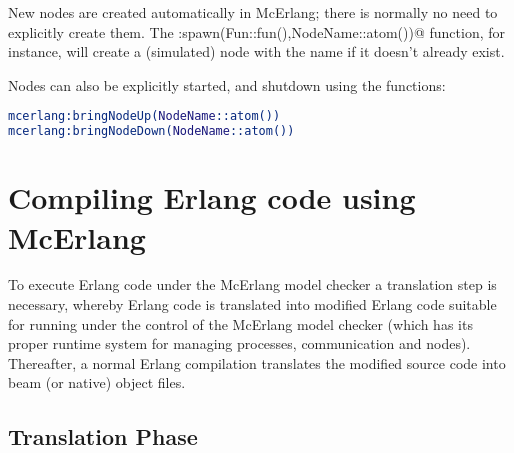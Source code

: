 \documentclass[a4paper]{article}
\begin{document}
New nodes are created automatically in McErlang; there is normally
no need to explicitly create them. 
The \lstinline@mcerlang:spawn(Fun::fun(),NodeName::atom())@
function, for instance, will create a (simulated) node
with the name \lstinline@NodeName@ if it doesn't already exist.

Nodes can also be explicitly started, and shutdown using
the functions:
\begin{lstlisting}[language=Erlang]
mcerlang:bringNodeUp(NodeName::atom())
mcerlang:bringNodeDown(NodeName::atom())
\end{lstlisting}


\section{Compiling Erlang code using McErlang}

To execute Erlang code under the McErlang
model checker a translation step is necessary,
whereby Erlang code is translated into modified Erlang code
suitable for running under the control of the McErlang model checker
(which has its proper runtime system for managing processes,
communication and nodes).
Thereafter, a normal Erlang compilation translates the modified source
code into beam (or native) object files.

\subsection{Translation Phase}
\label{translation}
\end{document}
